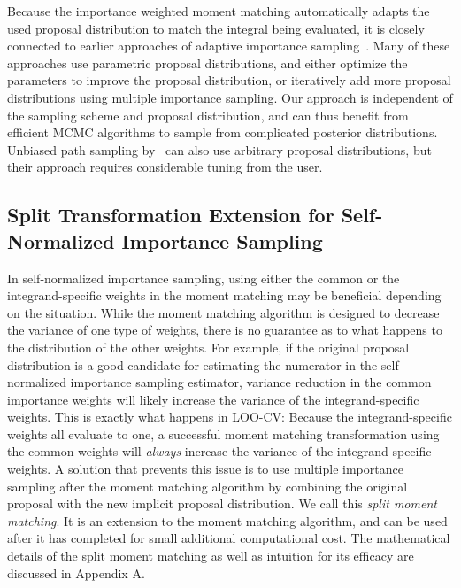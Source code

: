 \documentclass[12pt]{article}
\begin{document}
Because the importance weighted moment matching automatically adapts the used proposal
distribution to match the integral being evaluated, it is closely connected to
earlier approaches of adaptive importance sampling~\citep{lepage1978new,ortiz2000adaptive,cappe2004population, pennanen2006adaptive,raftery2010estimating,cornuet2012adaptive}.
Many of these approaches use parametric proposal distributions, and either optimize
the parameters to improve the proposal distribution, or iteratively add more proposal distributions
using multiple importance sampling.
Our approach is independent of the sampling scheme and proposal distribution, and can thus
benefit from efficient MCMC algorithms to sample from complicated
posterior distributions.
Unbiased path sampling by~\citet{rischard2018unbiased} can also use arbitrary proposal distributions, but their approach
requires considerable tuning from the user.





\subsection{Split Transformation Extension for Self-Normalized Importance Sampling} \label{sec:split}






In self-normalized importance sampling, using either the common or the
integrand-specific weights in the moment matching may be beneficial
depending on the situation.
While the moment matching algorithm is designed to decrease the variance
of one type of weights, there is no guarantee as to what happens
to the distribution of the other weights.
For example, if the original proposal distribution is a good candidate for
estimating the numerator in the self-normalized
importance sampling estimator, variance reduction in the common importance weights will likely
increase the variance of the integrand-specific weights. This is exactly what happens
in LOO-CV: Because the integrand-specific weights
all evaluate to one, a successful moment matching transformation using the common weights will \emph{always}
increase the variance of the integrand-specific weights.
A solution that prevents this issue is to
use multiple importance sampling after the moment matching algorithm by
combining the original proposal with the new implicit proposal distribution.
We call this \emph{split moment matching}. It is an extension to the moment matching algorithm, and
can be used after it has completed for small additional computational cost.
The mathematical details of the split moment matching as well as intuition for
its efficacy are discussed in Appendix A.
\end{document}
